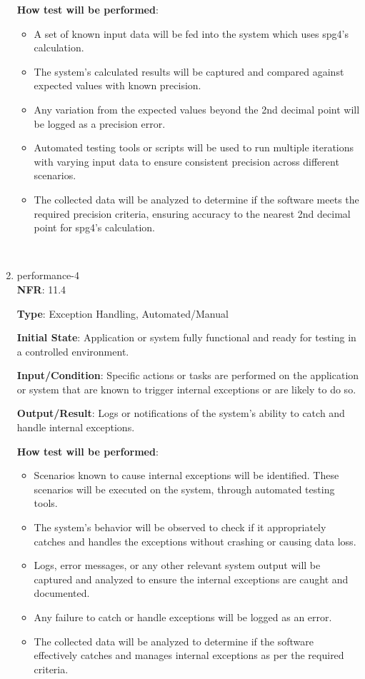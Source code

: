 \documentclass[12pt, titlepage]{article}
\begin{document}
\begin{enumerate}
\textbf{How test will be performed}: 
\begin{itemize}
    \item A set of known input data will be fed into the system which uses spg4's calculation.
    \item The system's calculated results will be captured and compared against expected values with known precision.
    \item Any variation from the expected values beyond the 2nd decimal point will be logged as a precision error.
    \item Automated testing tools or scripts will be used to run multiple iterations with varying input data to ensure consistent precision across different scenarios.
    \item The collected data will be analyzed to determine if the software meets the required precision criteria, ensuring accuracy to the nearest 2nd decimal point for spg4's calculation.
\end{itemize}\\

\item{performance-4 \\}
\textbf{NFR}: 11.4

\textbf{Type}: Exception Handling, Automated/Manual

\textbf{Initial State}: Application or system fully functional and ready for testing in a controlled environment.

\textbf{Input/Condition}: Specific actions or tasks are performed on the application or system that are known to trigger internal exceptions or are likely to do so.

\textbf{Output/Result}: Logs or notifications of the system's ability to catch and handle internal exceptions.

\textbf{How test will be performed}: 
\begin{itemize}
    \item Scenarios known to cause internal exceptions will be identified. These scenarios will be executed on the system, through automated testing tools.
    \item The system's behavior will be observed to check if it appropriately catches and handles the exceptions without crashing or causing data loss.
    \item Logs, error messages, or any other relevant system output will be captured and analyzed to ensure the internal exceptions are caught and documented.
    \item Any failure to catch or handle exceptions will be logged as an error.
    \item The collected data will be analyzed to determine if the software effectively catches and manages internal exceptions as per the required criteria.
\end{itemize}\\


\end{enumerate}
\end{document}

